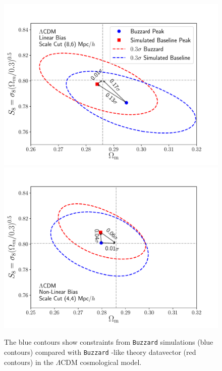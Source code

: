 \documentclass[aps, prd,twocolumn,superscriptaddress,nofootinbib,preprintnumbers]{revtex4-1}
\newcommand{\buzzard}{\texttt{Buzzard} }
\begin{document}


\begin{figure}
\includegraphics[width=\columnwidth]{figs/Buzzard_linbias86_2x2pt_lcdm.pdf}
\includegraphics[width=\columnwidth]{figs/Buzzard_nlbias44_2x2pt_lcdm.pdf}
\caption[]{The blue contours show constraints from \buzzard simulations (blue contours) compared with  \buzzard-like theory datavector (red contours) in the $\Lambda$CDM cosmological model.
}
\end{figure}
\end{document}
